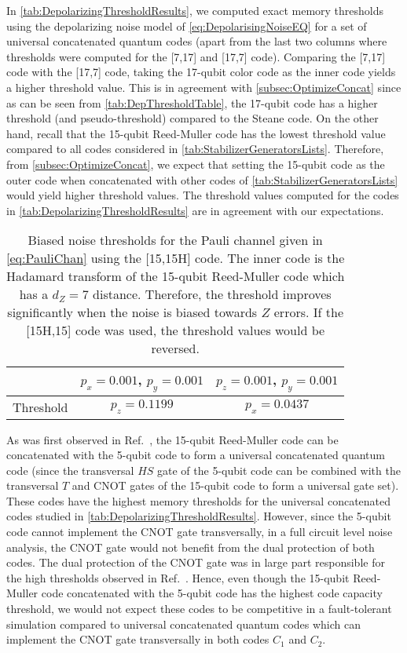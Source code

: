 \documentclass[pra,longbibliography,twocolumn,showpacs,nofootinbib,superscriptaddress,notitlepage]{revtex4-1}
\begin{document}
In \cref{tab:DepolarizingThresholdResults}, we computed exact memory thresholds using the depolarizing noise model of \cref{eq:DepolarisingNoiseEQ} for a set of universal concatenated quantum codes (apart from the last two columns where thresholds were computed for the [7,17] and [17,7] code). Comparing the [7,17] code with the [17,7] code, taking the 17-qubit color code as the inner code yields a higher threshold value. This is in agreement with \cref{subsec:OptimizeConcat} since as can be seen from \cref{tab:DepThresholdTable}, the 17-qubit code has a higher threshold (and pseudo-threshold) compared to the Steane code. On the other hand, recall that the 15-qubit Reed-Muller code has the lowest threshold value compared to all codes considered in \cref{tab:StabilizerGeneratorsLists}. Therefore, from \cref{subsec:OptimizeConcat}, we expect that setting the 15-qubit code as the outer code when concatenated with other codes of \cref{tab:StabilizerGeneratorsLists} would yield higher threshold values. The threshold values computed for the codes in \cref{tab:DepolarizingThresholdResults} are in agreement with our expectations.


\begin{table}
\begin{tabular}{ |c|c|c|}
\hline
& $p_{x} = 0.001$, $p_{y} = 0.001$ & $p_{z} = 0.001$, $p_{y} = 0.001$\\ \hline
Threshold & $p_{z} = 0.1199$ & $p_{x} = 0.0437$ \\ \hline
\end{tabular}
\caption{Biased noise thresholds for the Pauli channel given in \cref{eq:PauliChan} using the [15,15H] code. The inner code is the Hadamard transform of the 15-qubit Reed-Muller code which has a $d_{Z}=7$ distance. Therefore, the threshold improves significantly when the noise is biased towards $Z$ errors. If the [15H,15] code was used, the threshold values would be reversed.}
\label{tab:BiasedNoiseTab}
\end{table}

As was first observed in Ref.~\cite{NSZ16}, the 15-qubit Reed-Muller code can be concatenated with the 5-qubit code to form a universal concatenated quantum code (since the transversal $HS$ gate of the 5-qubit code can be combined with the transversal  $T$ and CNOT gates of the 15-qubit code to form a universal gate set). These codes have the highest memory thresholds for the universal concatenated codes studied in \cref{tab:DepolarizingThresholdResults}. However, since the 5-qubit code cannot implement the CNOT gate transversally, in a full circuit level noise analysis, the CNOT gate would not benefit from the dual protection of both codes. The dual protection of the CNOT gate was in large part responsible for the high thresholds observed in Ref.~\cite{CJL16}. Hence, even though the 15-qubit Reed-Muller code concatenated with the 5-qubit code has the highest code capacity threshold, we would not expect these codes to be competitive in a fault-tolerant simulation compared to universal concatenated quantum codes which can implement the CNOT gate transversally in both codes $C_{1}$ and $C_{2}$.
\end{document}
